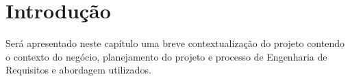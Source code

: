 \chapter[Introdução]{Introdução}
  
  Será apresentado neste capítulo uma breve contextualização do projeto contendo o contexto do negócio, planejamento do projeto e
  processo de Engenharia de Requisitos e abordagem utilizados.
  
  
  \vfill
  
  